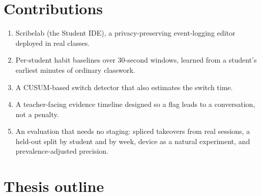 \section{Contributions}
\begin{enumerate}
  \item Scribelab (the Student IDE), a privacy-preserving event-logging editor
    deployed in real classes.
  \item Per-student habit baselines over 30-second windows, learned from a
    student's earliest minutes of ordinary classwork.
  \item A CUSUM-based switch detector that also estimates the switch time.
  \item A teacher-facing evidence timeline designed so a flag leads to a
    conversation, not a penalty.
  \item An evaluation that needs no staging: spliced takeovers from real
    sessions, a held-out split by student and by week, device as a natural
    experiment, and prevalence-adjusted precision.
\end{enumerate}

\section{Thesis outline}
